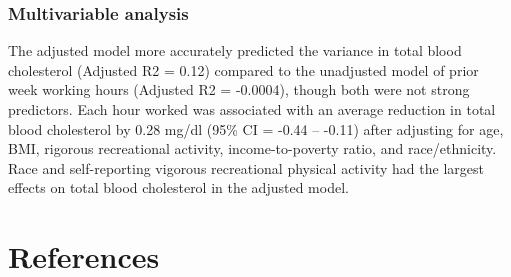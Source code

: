\documentclass[]{elsarticle} %
\begin{document}
\hypertarget{multivariable-analysis}{%
\subsubsection{Multivariable analysis}\label{multivariable-analysis}}

The adjusted model more accurately predicted the variance in total blood
cholesterol (Adjusted R2 = 0.12) compared to the unadjusted model of
prior week working hours (Adjusted R2 = -0.0004), though both were not
strong predictors. Each hour worked was associated with an average
reduction in total blood cholesterol by 0.28 mg/dl (95\% CI = -0.44 --
-0.11) after adjusting for age, BMI, rigorous recreational activity,
income-to-poverty ratio, and race/ethnicity. Race and self-reporting
vigorous recreational physical activity had the largest effects on total
blood cholesterol in the adjusted model.

\hypertarget{references}{%
\section*{References}\label{references}}
\end{document}
